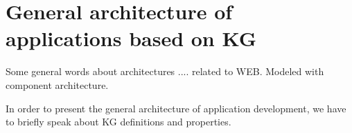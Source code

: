 \documentclass[
]{ceurart}
\begin{document}
\section{General architecture of applications based on KG}
\label{sec:architecture}

Some general words about architectures .... related to WEB.  Modeled with component architecture.

In order to present the general architecture of application development, we have to briefly speak about KG definitions and properties.

\end{document}
